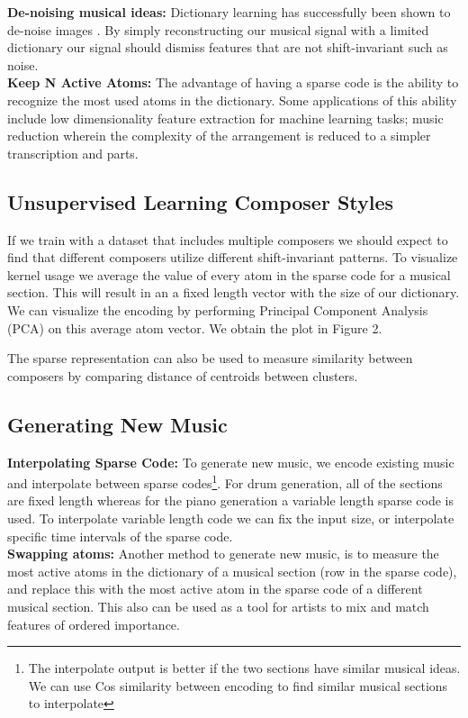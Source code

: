 \documentclass[11pt,a4paper]{article}
\begin{document}
 \textbf{De-noising musical ideas: } Dictionary learning has successfully been shown to de-noise images  \cite{Beckouche_2013}. By simply reconstructing our musical signal with a limited dictionary our signal should dismiss features that are not shift-invariant such as noise.
\\
 \textbf{Keep N Active Atoms: } The advantage of having a sparse code is the ability to recognize the most used atoms in the dictionary. Some applications of this ability include low dimensionality feature extraction for machine learning tasks; music reduction wherein the complexity of the arrangement is reduced to a simpler transcription and parts. 

\subsection{Unsupervised Learning Composer Styles }
If we train with a dataset that includes multiple composers we should expect to find that different composers utilize different shift-invariant patterns. To visualize kernel usage we average the value of every atom in the sparse code for a musical section. This will result in an a fixed length vector with the size of our dictionary. We can visualize the encoding by performing Principal Component Analysis (PCA) on this average atom vector. We obtain the plot in Figure 2. 

The sparse representation can also be used to measure similarity between composers by comparing distance of centroids between clusters.  

\subsection{Generating New Music}
 \textbf{Interpolating Sparse Code: } To generate new music, we encode existing music and interpolate between sparse codes\footnote{The interpolate output is better if the two sections have similar musical ideas. We can use Cos similarity between encoding to find similar musical sections to interpolate}. For drum generation, all of the sections are fixed length whereas for the piano generation a variable length sparse code is used. To interpolate variable length code we can fix the input size, or interpolate specific time intervals of the sparse code.
 \\
 \textbf{Swapping atoms: } Another method to generate new music, is to measure the most active atoms in the dictionary of a musical section (row in the sparse code), and replace this with the most active atom in the sparse code of a different musical section. This also can be used as a tool for artists to mix and match features of ordered importance. 
\end{document}
